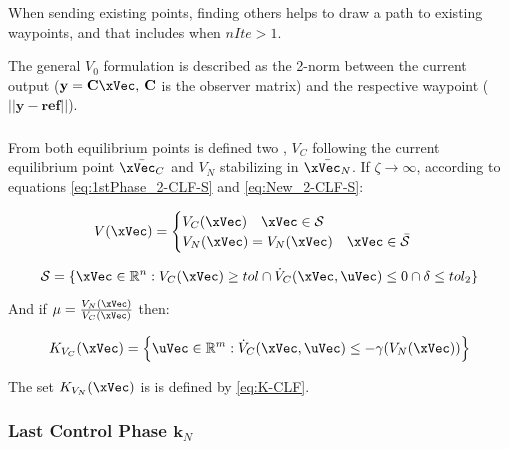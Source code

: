 When sending existing points, finding others helps to draw a path to existing waypoints, and that includes when \(nIte >1\).\par
The general  \(V_0\) formulation is described as the 2-norm between the current output (\(\mathbf{y} = \mathbf{C}\xVec, \hspace{0.2em}\mathbf{C}\) is the observer matrix) and the respective waypoint (\(||\mathbf{y}-\mathbf{ref}||\)).


\subsubsection{}
\label{subsubsec:CLFs_Independent_Algorithm}

From both equilibrium points is defined two , \(V_C\) following the current equilibrium point \(\bar{\xVec_C}\) and \(V_N\) stabilizing in \(\bar{\xVec_N}\). If \(\zeta \to \infty\), according to equations \ref{eq:1stPhase_2-CLF-S} and \ref{eq:New_2-CLF-S}:


\begin{align}
    V(\xVec) = 
    \begin{cases}
        V_C(\xVec) \quad \xVec \in \mathcal{S}\\
        V_N(\xVec) = V_{N}(\xVec) \quad \xVec \in \bar{\mathcal{S}}
    \end{cases}
    \label{eq:New_2-CLF-I}
\end{align}


\begin{equation}
    \mathcal{S} = \{\xVec \in \mathbb{R}^n: V_{C}(\xVec) \geq tol \cap \dot{V}_{C}(\xVec, \uVec) \leq 0 \cap \delta \leq tol_2\}
    \label{eq:New_2-CLF-I_actuationPhaseSet}
\end{equation}



And if \(\mu = \frac{V_{N}(\xVec)}{V_{C}(\xVec)}\) then:

\begin{align}
    K_{V_C}(\xVec) = \Bigl\{\uVec \in \mathbb{R}^m:  \dot{V}_{C}(\xVec, \uVec) \leq -\gamma( V_{N}(\xVec)  )\Bigr\}
    \label{eq:2-CLF-I_Constraint}
\end{align}

The set \(K_{V_N}(\xVec)\) is is defined by \ref{eq:K-CLF}. \par


\newpage %

\subsubsection{Last Control Phase \(\mathbf{k}_N\)}
\label{subsubsec:Last_Control_Phase}

